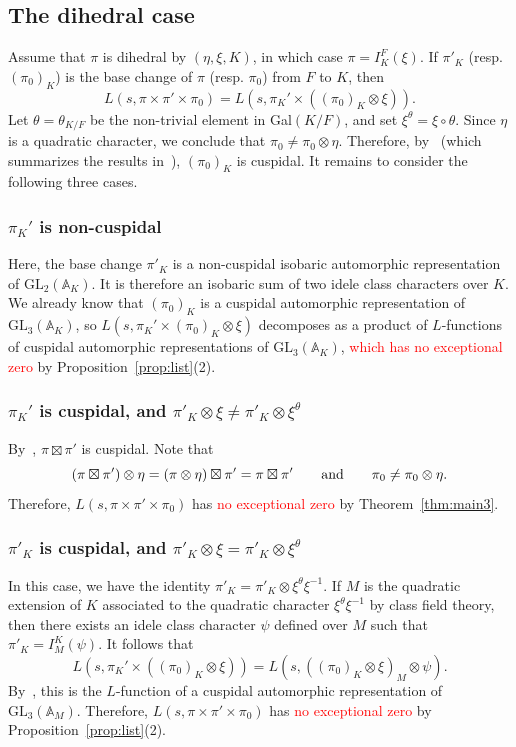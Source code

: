 \documentclass[11pt]{amsart}
\theoremstyle{remark}
\newcommand{\GL}{\mathrm{GL}}
\numberwithin{equation}{section}
\begin{document}
\subsection{The dihedral case}
Assume that $\pi$ is dihedral by $(\eta,\xi,K)$, in which case $\pi = I_K^F(\xi)$.  If $\pi'_K$ (resp. $(\pi_0)_K$) is the base change of $\pi$ (resp. $\pi_0$) from $F$ to $K$, then
\[
L(s,\pi \times \pi' \times \pi_0) = L(s,\pi_K' \times ((\pi_0)_K \otimes \xi)).
\]
Let $\theta = \theta_{K/F}$ be the non-trivial element in Gal$(K/F)$, and set $\xi^\theta = \xi \circ \theta$. Since $\eta$ is a quadratic character, we conclude that $\pi_0 \neq \pi_0 \otimes \eta$.  Therefore, by~\cite[Proposition 2.3.1(5)]{Ramakrishnan} (which summarizes the results in~\cite{AC}), $(\pi_0)_K$ is cuspidal.  It remains to consider the following three cases.
\subsubsection{$\pi_K'$ is non-cuspidal}
Here, the base change $\pi'_K$ is a non-cuspidal isobaric automorphic representation of $\GL_2(\mathbb{A}_K)$.  It is therefore an isobaric sum of two idele class characters over $K$.  We already know that $(\pi_0)_K$ is a cuspidal automorphic representation of $\GL_3(\mathbb{A}_K)$, so $L(s,\pi_K' \times (\pi_0)_K \otimes \xi)$ decomposes as a product of $L$-functions of cuspidal automorphic representations of $\GL_3(\mathbb{A}_K)$, \textcolor{red}{which has no exceptional zero} by Proposition~\ref{prop:list}(2).
\subsubsection{$\pi_K'$ is cuspidal, and $\pi'_K \otimes \xi \neq \pi'_K \otimes \xi^\theta$}
By~\cite[Theorem M]{Ramakrishnan}, $\pi \boxtimes \pi'$ is cuspidal. Note that 
\[
(\pi \boxtimes \pi') \otimes \eta = (\pi \otimes \eta) \boxtimes \pi' = \pi \boxtimes \pi'\qquad\textup{and}\qquad\pi_0 \neq \pi_0 \otimes \eta.
\]
Therefore, $L(s,\pi\times \pi'\times \pi_0)$ has \textcolor{red}{no exceptional zero} by Theorem~\ref{thm:main3}.
\subsubsection{$\pi'_K$ is cuspidal, and $\pi'_K \otimes \xi = \pi'_K \otimes \xi^\theta$}
In this case, we have the identity $\pi'_K = \pi'_K \otimes \xi^\theta\xi^{-1}$.  If $M$ is the quadratic extension of $K$ associated to the quadratic character $\xi^\theta\xi^{-1}$ by class field theory, then there exists an idele class character $\psi$ defined over $M$ such that $\pi'_K = I_M^K(\psi)$.  It follows that
\[
L(s,\pi_K' \times ((\pi_0)_K \otimes \xi)) = L(s,((\pi_0)_K \otimes \xi)_M \otimes \psi).
\]
By~\cite[Proposition 2.3.1(5)]{Ramakrishnan}, this is the $L$-function of a cuspidal automorphic representation of $\GL_3(\mathbb{A}_M)$.  Therefore, $L(s,\pi\times \pi'\times \pi_0)$ has \textcolor{red}{no exceptional zero} by Proposition~\ref{prop:list}(2).
\end{document}
